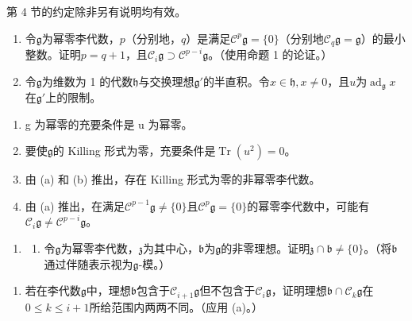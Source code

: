
第 4 节的约定除非另有说明均有效。

\begin{enumerate}
\def\labelenumi{\arabic{enumi}.}
\item
  令\(\mathfrak{g}\)为幂零李代数，\(p\)（分别地，\(q\)）是满足\(\mathcal{C}^p\mathfrak{g} = \{0\}\)（分别地\(\mathcal{C}_q\mathfrak{g} = \mathfrak{g}\)）的最小整数。证明\(p = q + 1\)，且\(\mathcal{C}_i\mathfrak{g} \supset \mathcal{C}^{p - i}\mathfrak{g}\)。（使用命题 1 的论证。）
\item
  令\(\mathfrak{g}\)为维数为 1 的代数\(\mathfrak{h}\)与交换理想\(\mathfrak{g}'\)的半直积。令\(x \in \mathfrak{h}, x \neq 0\)，且\(u\)为\(\operatorname{ad}_{\mathfrak{g}} x\)在\(\mathfrak{g}'\)上的限制。
\end{enumerate}

\begin{enumerate}
\def\labelenumi{(\alph{enumi})}
\item
  g 为幂零的充要条件是 u 为幂零。
\item
  要使\(\mathfrak{g}\)的 Killing 形式为零，充要条件是\(\operatorname{Tr}(u^2) = 0\)。
\item
  由 (a) 和 (b) 推出，存在 Killing 形式为零的非幂零李代数。
\item
  由 (a) 推出，在满足\(\mathcal{C}^{p-1}\mathfrak{g} \neq \{0\}\)且\(\mathcal{C}^p\mathfrak{g} = \{0\}\)的幂零李代数中，可能有\(\mathcal{C}_i\mathfrak{g} \neq \mathcal{C}^{p-i}\mathfrak{g}\)。
\end{enumerate}

\begin{enumerate}
\def\labelenumi{\arabic{enumi}.}
\setcounter{enumi}{2}
\tightlist
\item
  \begin{enumerate}
  \def\labelenumii{(\alph{enumii})}
  \tightlist
  \item
    令\(\mathfrak{g}\)为幂零李代数，\(\mathfrak{z}\)为其中心，\(\mathfrak{b}\)为\(\mathfrak{g}\)的非零理想。证明\(\mathfrak{z} \cap \mathfrak{b} \neq \{0\}\)。（将\(\mathfrak{b}\)通过伴随表示视为\(\mathfrak{g}\)-模。）
  \end{enumerate}
\end{enumerate}

\begin{enumerate}
\def\labelenumi{(\alph{enumi})}
\setcounter{enumi}{1}
\tightlist
\item
  若在李代数\(\mathfrak{g}\)中，理想\(\mathfrak{b}\)包含于\(\mathcal{C}_{i+1}\mathfrak{g}\)但不包含于\(\mathcal{C}_i\mathfrak{g}\)，证明理想\(\mathfrak{b} \cap \mathcal{C}_k\mathfrak{g}\)在\(0 \leqslant k \leqslant i + 1\)所给范围内两两不同。（应用 (a)。）
\end{enumerate}

